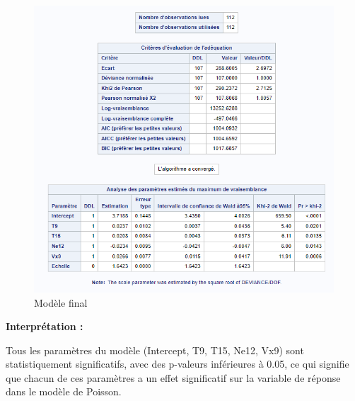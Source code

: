 \documentclass[12pt,a4paper]{article}
\begin{document}
\begin{figure}[H]
	\centering
	\includegraphics[width=\textwidth]{Model_Final_GLM.PNG}
	\caption{Modèle final}
	\label{fig:modele_final}
\end{figure}

\textbf{Interprétation :}

Tous les paramètres du modèle (Intercept, T9, T15, Ne12, Vx9) sont statistiquement significatifs, avec des p-valeurs inférieures à 0.05, ce qui signifie que chacun de ces paramètres a un effet significatif sur la variable de réponse dans le modèle de Poisson.
\end{document}
